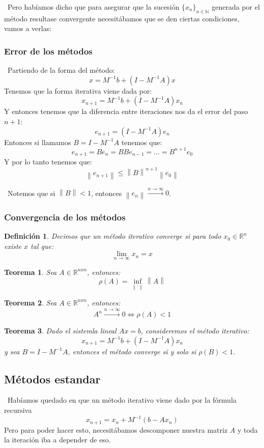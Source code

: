 \documentclass[12pt, oneside]{book}
\newtheorem*{definition}{Definición}
\newtheorem*{theorem}{Teorema}
\newcommand{\norm}[1]{\left\lVert#1\right\rVert}
\begin{document}
\ Pero habíamos dicho que para asegurar que la sucesión $\{x_n\}_{n \in \mathbb{N}}$ generada por el método resultase convergente necesitábamos que se den ciertas condiciones, vamos a verlas:

\subsubsection{Error de los métodos}
\ Partiendo de la forma del método: $$x=M^{-1}b+(I-M^{-1}A)x$$ Tenemos que la forma iterativa viene dada por: $$x_{n+1}=M^{-1}b+(I-M^{-1}A)x_n$$ Y entonces tenemos que la diferencia entre iteraciones nos da el error del paso $n+1$: $$e_{n+1}=(I-M^{-1}A)e_n$$ Entonces si llamamos $B=I-M^{-1}A$ tenemos que: $$e_{n+1}=Be_n=BBe_{n-1}=\dots=B^{n+1}e_0$$ Y por lo tanto tenemos que: $$\norm{e_{n+1}} \leq \norm{B}^{n+1}\norm{e_0}$$

\ Notemos que si $\norm{B}<1$, entonces $\norm{e_n}\xrightarrow{n \xrightarrow{} \infty}0$.

\subsubsection{Convergencia de los métodos}
\begin{definition}
	Decimos que un método iterativo converge si para todo $x_0 \in \mathbb{R}^n$ existe $x$ tal que: $$\lim_{n \to \infty}x_n=x$$
\end{definition}

\begin{theorem}
	Sea $A \in \mathbb{R}^{nxn}$, entonces: $$\rho(A)=\inf_{\norm{\cdot}}\norm{A}$$
\end{theorem}

\begin{theorem}
	Sea $A \in \mathbb{R}^{nxn}$, entonces: $$A^n \xrightarrow{n \xrightarrow{} \infty}0 \iff \rho(A)<1$$ 
\end{theorem}

\begin{theorem}
	Dado el sistemla lineal $Ax=b$, consideremos el método iterativo: $$x_{n+1}=M^{-1}b+(I-M^{-1}A)x_n$$ y sea $B=I-M^{-1}A$, entonces el método converge si y solo si $\rho(B)<1$.
\end{theorem}

\subsection{Métodos estandar}
\ Habíamos quedado en que un método iterativo viene dado por la fórmula recursiva $$x_{n+1}=x_n+M^{-1}(b-Ax_n)$$ Pero para poder hacer esto, necesitábamos descomponer nuestra matriz $A$ y toda la iteración iba a depender de eso.
\end{document}
